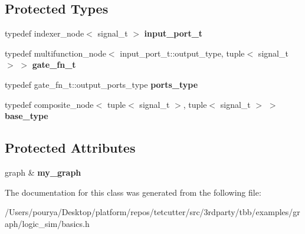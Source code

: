 \subsection*{Protected Types}
\begin{DoxyCompactItemize}
\item 
\hypertarget{classgate_3_011_01_4_a91ee56d4d0677c093d0a8fb1d504c3e6}{}typedef indexer\+\_\+node$<$ signal\+\_\+t $>$ {\bfseries input\+\_\+port\+\_\+t}\label{classgate_3_011_01_4_a91ee56d4d0677c093d0a8fb1d504c3e6}

\item 
\hypertarget{classgate_3_011_01_4_a4257ca69d550ca229e078198abbb6f34}{}typedef multifunction\+\_\+node$<$ input\+\_\+port\+\_\+t\+::output\+\_\+type, tuple$<$ signal\+\_\+t $>$ $>$ {\bfseries gate\+\_\+fn\+\_\+t}\label{classgate_3_011_01_4_a4257ca69d550ca229e078198abbb6f34}

\item 
\hypertarget{classgate_3_011_01_4_a5b4c0bcebe22dc63fa93094424f1d36c}{}typedef gate\+\_\+fn\+\_\+t\+::output\+\_\+ports\+\_\+type {\bfseries ports\+\_\+type}\label{classgate_3_011_01_4_a5b4c0bcebe22dc63fa93094424f1d36c}

\item 
\hypertarget{classgate_3_011_01_4_a358198514407eba0c84cc19af1b51fc6}{}typedef composite\+\_\+node$<$ tuple$<$ signal\+\_\+t $>$, tuple$<$ signal\+\_\+t $>$ $>$ {\bfseries base\+\_\+type}\label{classgate_3_011_01_4_a358198514407eba0c84cc19af1b51fc6}

\end{DoxyCompactItemize}
\subsection*{Protected Attributes}
\begin{DoxyCompactItemize}
\item 
\hypertarget{classgate_3_011_01_4_a40a832a13ad77c6b966e7753e8763cf7}{}graph \& {\bfseries my\+\_\+graph}\label{classgate_3_011_01_4_a40a832a13ad77c6b966e7753e8763cf7}

\end{DoxyCompactItemize}


The documentation for this class was generated from the following file\+:\begin{DoxyCompactItemize}
\item 
/\+Users/pourya/\+Desktop/platform/repos/tetcutter/src/3rdparty/tbb/examples/graph/logic\+\_\+sim/basics.\+h\end{DoxyCompactItemize}
